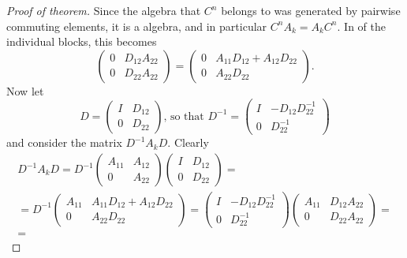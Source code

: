 \documentclass[12pt]{article}
\begin{document}
\begin{proof}[Proof of theorem]
  Since the algebra that $C^n$ belongs to was generated by pairwise 
  commuting elements, it is a  
  algebra, and in particular \(C^n A_k = A_k C^n\). In 
  of the individual blocks, this 
  becomes
  \begin{equation*}
    \begin{pmatrix}
      0& D_{12}A_{22} \\
      0& D_{22}A_{22}
    \end{pmatrix} = \begin{pmatrix}
      0& A_{11}D_{12} + A_{12}D_{22} \\
      0& A_{22}D_{22}
    \end{pmatrix}
    \text{.}
  \end{equation*}
  Now let
  \begin{equation*}
    D = \begin{pmatrix} I& D_{12} \\ 0& D_{22} \end{pmatrix}
    \text{, so that }
    D^{-1} = \begin{pmatrix} 
      I& -D_{12}D_{22}^{-1} \\ 
      0& D_{22}^{-1}
    \end{pmatrix}
  \end{equation*}
  and consider the matrix \(D^{-1}A_kD\). Clearly
  \begin{multline*}
    D^{-1}A_kD =
    D^{-1} \begin{pmatrix} A_{11}& A_{12} \\ 0& A_{22} \end{pmatrix}
      \begin{pmatrix} I& D_{12} \\ 0& D_{22} \end{pmatrix} = \\ =
    D^{-1} \begin{pmatrix}
      A_{11}& A_{11}D_{12} + A_{12}D_{22} \\
      0& A_{22} D_{22}
    \end{pmatrix} = 
    \begin{pmatrix} 
      I& -D_{12}D_{22}^{-1} \\ 0& D_{22}^{-1} 
    \end{pmatrix}
    \begin{pmatrix} 
      A_{11}& D_{12}A_{22} \\ 0& D_{22} A_{22}
    \end{pmatrix} = \\ =

\end{multline*}
\end{proof}
\end{document}
